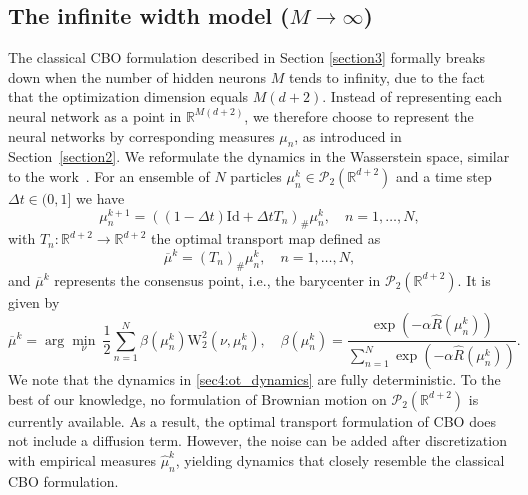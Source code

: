 \documentclass[a4paper, 11pt]{article}
\newcommand{\R}{\mathbb{R}}
\newcommand{\Pw}{\mathcal{P}_{2}\left( \R^{d+2} \right) }
\theoremstyle{plain} %
\begin{document}
	\subsection{The infinite width model ($ M \to \infty $)}\label{limit_M}
	The classical CBO formulation described in Section \ref{section3} formally breaks down when the number of hidden neurons $ M $ tends to infinity, due to the fact that the optimization dimension equals $ M(d+2) $. Instead of representing each neural network as a point in $ \R^{M(d+2)} $, we therefore choose to represent the neural networks by corresponding measures $ \mu_{n} $, as introduced in Section~\ref{section2}. We reformulate the dynamics in the Wasserstein space, similar to the work~\cite{borghi2024}. For an ensemble of $ N $ particles $ \mu^{k}_{n} \in \Pw $ and a time step $ \Delta t \in (0,1] $  we have  
	\begin{equation}\label{sec4:ot_dynamics}
		\mu_{n}^{k+1} = \left( \left( 1 - \Delta t \right)\text{Id} + \Delta t T_{n} \right)_{\#}\mu_{n}^{k},\quad n=1,\dots,N,
	\end{equation}
	with $ T_{n} : \R^{d+2} \to \R^{d+2}$ the optimal transport map defined as 
	\begin{equation}
		\overline{\mu}^{k} = \left( T_{n} \right)_{\#}\mu_{n}^{k}, \quad n=1,\dots,N,
	\end{equation} 
	and $ \overline{\mu}^{k} $ represents the consensus point, i.e., the barycenter in $ \Pw $. It is given by
	\begin{equation}\label{eq:barycenter}
		\overline{\mu}^{k} = \arg \min_{\nu}~ \frac{1}{2}\sum_{n=1}^{N} \beta\left( \mu_{n}^{k}\right)\mathrm{W}_{2}^{2}\left( \nu, \mu_{n}^{k} \right), \quad \beta(\mu_{n}^{k}) = \frac{\exp(-\alpha \hat{R}(\mu_{n}^{k}))}{\sum_{n=1}^{N}\exp(-\alpha \hat{R}(\mu_{n}^{k}))}.    
	\end{equation} 
	We note that the dynamics in \eqref{sec4:ot_dynamics} are fully deterministic. To the best of our knowledge, no formulation of Brownian motion on $ \Pw$ is currently available. As a result, the optimal transport formulation of CBO does not include a diffusion term. However, the noise can be added after discretization with empirical measures $ \hat{\mu}^{k}_{n} $, yielding dynamics that closely resemble the classical CBO formulation. 
	
\end{document}
